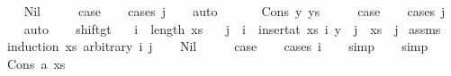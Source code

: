 \begin{isabellebody}
\ \ \isamarkupfalse%
\ Nil\isanewline
\ \ \isamarkupfalse%
\ \isamarkupfalse%
\ {\isacharquery}{\kern0pt}case\isanewline
\ \ \isamarkupfalse%
\ {\isacharparenleft}{\kern0pt}cases\ j{\isacharparenright}{\kern0pt}\isanewline
\ \ \isamarkupfalse%
\ auto\isanewline
\ \ \isamarkupfalse%
\isanewline
{}\isamarkupfalse%
\isanewline
\ \ \isamarkupfalse%
\ {\isacharparenleft}{\kern0pt}Cons\ y\ ys{\isacharparenright}{\kern0pt}\isanewline
\ \ \isamarkupfalse%
\ \isamarkupfalse%
\ {\isacharquery}{\kern0pt}case\isanewline
\ \ \isamarkupfalse%
\ {\isacharparenleft}{\kern0pt}cases\ j{\isacharparenright}{\kern0pt}\isanewline
\ \ \isamarkupfalse%
\ auto\isanewline
\ \ \isamarkupfalse%
\isanewline
{}\isamarkupfalse%
%
\endisatagproof
{\isafoldproof}%
%
\isadelimproof
\isanewline
%
\endisadelimproof
\isanewline
\isanewline
\isanewline
{}\isamarkupfalse%
\ shift{\isacharunderscore}{\kern0pt}gt{\isacharcolon}{\kern0pt}\isanewline
\ \ \ {\isachardoublequoteopen}i\ {\isasymle}\ length\ xs{\isachardoublequoteclose}\isanewline
\ \ \ {\isachardoublequoteopen}j\ {\isacharless}{\kern0pt}\ i\ {\isacharequal}{\kern0pt}{\isacharequal}{\kern0pt}{\isachargreater}{\kern0pt}\ {\isacharparenleft}{\kern0pt}insert{\isacharunderscore}{\kern0pt}at\ xs\ i\ y{\isacharparenright}{\kern0pt}\ {\isacharbang}{\kern0pt}\ j\ {\isacharequal}{\kern0pt}\ xs\ {\isacharbang}{\kern0pt}\ j{\isachardoublequoteclose}\isanewline
%
\isadelimproof
%
\endisadelimproof
%
\isatagproof
{}\isamarkupfalse%
\ assms\isanewline
{}\isamarkupfalse%
\ {\isacharparenleft}{\kern0pt}induction\ xs\ arbitrary{\isacharcolon}{\kern0pt}\ i\ j{\isacharparenright}{\kern0pt}\isanewline
\ \ \isamarkupfalse%
\ Nil\isanewline
\ \ \isamarkupfalse%
\ \isamarkupfalse%
\ {\isacharquery}{\kern0pt}case\isanewline
\ \ \isamarkupfalse%
\ {\isacharparenleft}{\kern0pt}cases\ i{\isacharparenright}{\kern0pt}\isanewline
\ \ \isamarkupfalse%
\ simp\isanewline
\ \ \isamarkupfalse%
\ simp\isanewline
{}\isamarkupfalse%
\isanewline
\ \ \isamarkupfalse%
\ {\isacharparenleft}{\kern0pt}Cons\ a\ xs{\isacharparenright}{\kern0pt}\isanewline

\end{isabellebody}
